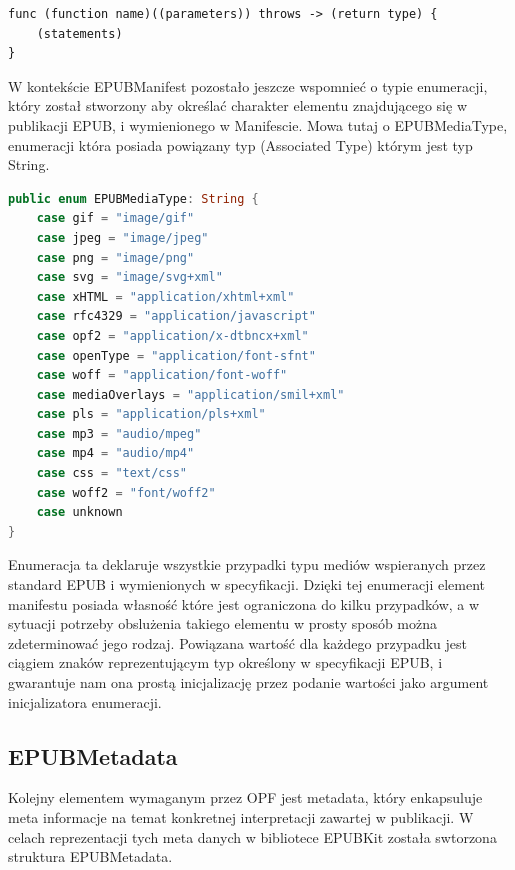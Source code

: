 \begin{lstlisting}[caption={Funkcje i metody które mogą rzucać błędy, przy deklaracji muszą zostać oznaczone słowem kluczowym "throws"\cite{theSwiftProgrammingLanguageDeclarations}.},language=swift-reference]
func (function name)((parameters)) throws -> (return type) {
    (statements)
}
\end{lstlisting}

W kontekście EPUBManifest pozostało jeszcze wspomnieć o typie enumeracji, który został stworzony aby określać charakter elementu znajdującego się w publikacji EPUB, i wymienionego w Manifescie. Mowa tutaj o EPUBMediaType, enumeracji która posiada powiązany typ (Associated Type) którym jest typ String.

\begin{lstlisting}[caption={Enumeracja EPUBMediaType.}, language=swift]
public enum EPUBMediaType: String {
    case gif = "image/gif"
    case jpeg = "image/jpeg"
    case png = "image/png"
    case svg = "image/svg+xml"
    case xHTML = "application/xhtml+xml"
    case rfc4329 = "application/javascript"
    case opf2 = "application/x-dtbncx+xml"
    case openType = "application/font-sfnt"
    case woff = "application/font-woff"
    case mediaOverlays = "application/smil+xml"
    case pls = "application/pls+xml"
    case mp3 = "audio/mpeg"
    case mp4 = "audio/mp4"
    case css = "text/css"
    case woff2 = "font/woff2"
    case unknown
}
\end{lstlisting}

Enumeracja ta deklaruje wszystkie przypadki typu mediów wspieranych przez standard EPUB i wymienionych w specyfikacji. Dzięki tej enumeracji element manifestu posiada własność które jest ograniczona do kilku przypadków, a w sytuacji potrzeby obslużenia takiego elementu w prosty sposób można zdeterminować jego rodzaj. Powiązana wartość dla każdego przypadku jest ciągiem znaków reprezentującym typ określony w specyfikacji EPUB, i gwarantuje nam ona prostą inicjalizację przez podanie wartości jako argument inicjalizatora enumeracji.

\subsection{EPUBMetadata}

Kolejny elementem wymaganym przez OPF jest metadata, który enkapsuluje meta informacje na temat konkretnej interpretacji zawartej w publikacji. W celach reprezentacji tych meta danych w bibliotece EPUBKit została swtorzona struktura EPUBMetadata.

